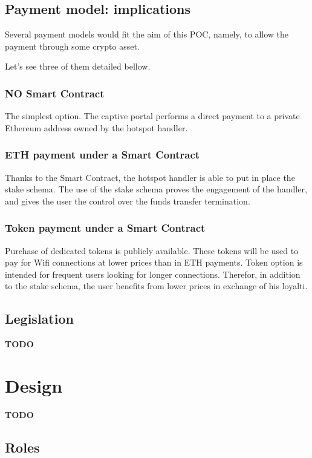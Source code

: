\documentclass[12pt]{report}
\begin{document}
	\subsection{Payment model: implications}

  Several payment models would fit the aim of this POC, namely, to allow the payment through some crypto asset.

  Let's see three of them detailed bellow.


	\subsubsection{NO Smart Contract}

  The simplest option. The captive portal performs a direct payment to a private Ethereum address owned by the hotspot handler.

	\subsubsection{ETH payment under a Smart Contract}

  Thanks to the Smart Contract, the hotspot handler is able to put in place the stake schema. The use of the stake schema proves the engagement of the handler, and gives the user the control over the funds transfer termination.

  \subsubsection{Token payment under a Smart Contract}

  Purchase of dedicated tokens is publicly available. These tokens will be used to pay for Wifi connections at lower prices than in ETH payments. Token option is intended for frequent users looking for longer connections. Therefor, in addition to the stake schema, the user benefits from lower prices in exchange of his loyalti.

	\subsection{Legislation} \label{ch:legislation}
  \textbf{TODO}

  \section{Design} \label{ch:design}
  \textbf{TODO}

  \subsection{Roles} \label{ch:roles}
\end{document}
